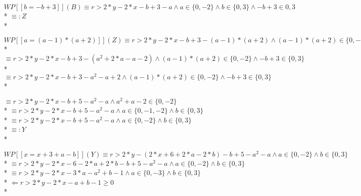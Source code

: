 \documentclass{article}
\begin{document}
$ WP[\![b=-b+3]\!](B) \equiv r>2*y-2*x-b+3-a \land a \in \{0,-2\} \land b \in \{0,3\} \land -b+3 \in {0,3} $ \\*
$ \equiv: Z $ \\*

$ WP[\![a=(a-1)*(a+2)]\!](Z) \equiv r>2*y-2*x-b+3-(a-1)*(a+2) \land (a-1)*(a+2) \in \{0,-2\} \land -b+3\in\{0,3\} $ \\*
$ \equiv r>2*y-2*x-b+3-(a^2+2*a-a-2) \land (a-1)*(a+2) \in \{0, -2\} \land -b+3 \in \{0,3\} $ \\*
$ \equiv r>2*y-2*x-b+3-a^2-a+2\land (a-1)*(a+2) \in \{0, -2\}\land -b +3 \in \{0, 3\} $ \\*

$ \equiv r>2*y-2*x-b+5-a^2-a \land a^2+a-2 \in \{0, -2\} $ \\*
$ \equiv r>2*y-2*x-b+5-a^2-a \land a \in \{0, -1, -2\} \land b \in \{0, 3\} $ \\*
$ \equiv r>2*y-2*x-b+5-a^2-a \land a\in \{0, -2\} \land b \in \{0, 3\} $ \\*
$ \equiv: Y $ \\*

$ WP[\![x=x+3+a-b]\!](Y) \equiv r>2*y-(2*x+6+2*a-2*b)-b+5-a^2-a \land a \in \{0, -2\} \land b \in \{0, 3\} $ \\*
$ \equiv r>2*y-2*x-6-2*a+2*b-b+5-a^2-a \land a \in \{0, -2\} \land b \in \{0, 3\} $ \\*
$ \equiv r>2*y-2*x-3*a-a^2+b-1\land a \in \{0, -3\} \land b \in \{0, 3\} $ \\*
$ \Leftarrow r>2*y-2*x-a+b-1 \ge 0 $ \\*
\end{document}
